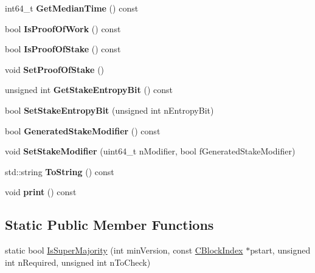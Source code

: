 \begin{DoxyCompactItemize}
\mbox{\label{class_c_block_index_ab9eb0f83c3465b404236084cdab9a9cd}} 
int64\+\_\+t {\bfseries Get\+Median\+Time} () const
\item 
\mbox{\label{class_c_block_index_a857e290d668b5f2e9c19cd9c6f5b3eb3}} 
bool {\bfseries Is\+Proof\+Of\+Work} () const
\item 
\mbox{\label{class_c_block_index_a2438a891e9d43821c0d99e1bdac56fde}} 
bool {\bfseries Is\+Proof\+Of\+Stake} () const
\item 
\mbox{\label{class_c_block_index_a4c1eb937c07db986f698909e66754c9e}} 
void {\bfseries Set\+Proof\+Of\+Stake} ()
\item 
\mbox{\label{class_c_block_index_a22a225e6caa79bb05f4d996cc48ca7ad}} 
unsigned int {\bfseries Get\+Stake\+Entropy\+Bit} () const
\item 
\mbox{\label{class_c_block_index_a7a161878ce10e36cf7c12004f31357cf}} 
bool {\bfseries Set\+Stake\+Entropy\+Bit} (unsigned int n\+Entropy\+Bit)
\item 
\mbox{\label{class_c_block_index_a7b629ae58cb86d49d7fb6f4f7411062d}} 
bool {\bfseries Generated\+Stake\+Modifier} () const
\item 
\mbox{\label{class_c_block_index_acc51fc41aa2b57c4f700aa09cdde92f8}} 
void {\bfseries Set\+Stake\+Modifier} (uint64\+\_\+t n\+Modifier, bool f\+Generated\+Stake\+Modifier)
\item 
\mbox{\label{class_c_block_index_a18258e956a4bc77dcccdb0db8f91effe}} 
std\+::string {\bfseries To\+String} () const
\item 
\mbox{\label{class_c_block_index_a8359f5c4e7dab949d66932c4e046b6ab}} 
void {\bfseries print} () const
\end{DoxyCompactItemize}
\subsection*{Static Public Member Functions}
\begin{DoxyCompactItemize}
\item 
static bool \mbox{\hyperlink{class_c_block_index_a6de57239c4944a5c768ec46830120962}{Is\+Super\+Majority}} (int min\+Version, const \mbox{\hyperlink{class_c_block_index}{C\+Block\+Index}} $\ast$pstart, unsigned int n\+Required, unsigned int n\+To\+Check)
\end{DoxyCompactItemize}
